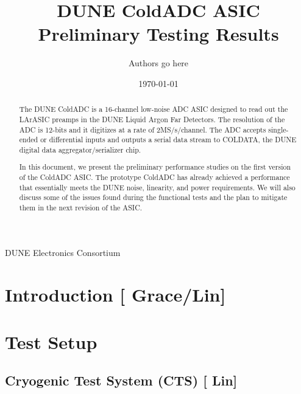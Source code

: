 \documentclass[10pt]{article}
\begin{document}

\title{DUNE ColdADC ASIC Preliminary Testing Results}

\date{\today}
\author{Authors go here}
%	
%	

\maketitle

\centerline{DUNE Electronics Consortium}



\begin{abstract}
The DUNE ColdADC is a 16-channel low-noise ADC ASIC designed to read out the LArASIC preamps in the DUNE Liquid Argon Far Detectors. The resolution of the ADC is 12-bits and it digitizes at a rate of 2MS/s/channel. The ADC accepts single-ended or differential inputs and outputs a serial data stream to COLDATA, the DUNE digital data aggregator/serializer chip.

In this document, we present the preliminary performance studies on the first version of the ColdADC ASIC. The prototype ColdADC has already achieved a performance that essentially meets the DUNE noise, linearity, and power requirements. We will also discuss some of the issues found during the functional tests and the plan to mitigate them in the next revision of the ASIC.
\end{abstract}


\newpage
\tableofcontents

\newpage

\section{Introduction [{\color{red} Grace/Lin}] }




\section{Test Setup}

\subsection{Cryogenic Test System (CTS) [{\color{red} Lin}] }

\end{document}
